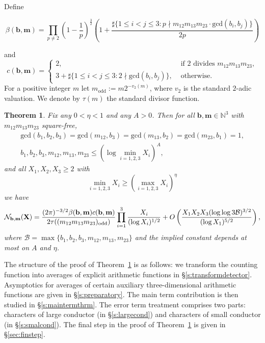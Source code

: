 \documentclass[a4paper,12pt,reqno]{amsart}
\numberwithin{equation}{section} \numberwithin{figure}{section}
\newcommand\N{\mathbb{N}}
\renewcommand{\l}{\left}
\renewcommand{\r}{\right}
\renewcommand{\b}{\mathbf}
\renewcommand{\c}{\mathcal}
\renewcommand{\gcd}{\textrm{gcd}}
\renewcommand{\leq}{\leqslant}
\renewcommand{\geq}{\geqslant}
\renewcommand{\#}{\sharp}
\newtheorem{theorem}[lemma]{Theorem}
\theoremstyle{definition}
\numberwithin{lemma}{section}
\newcommand{\beq}[2]
{
\begin{equation}
\label{#1}
{#2}
\end{equation}
}
\begin{document}
Define 
\beq{defbetabm}
{
\beta(\b b , \b m )= 
 \prod_{  p\neq 2  } 
 \l(1-\frac{1}{p} \r)^{\frac{3}{2} }
\l(1+  \frac{\#\{1\leq i < j  \leq 3 : p\nmid m_{12} m_{13}  m_{23} \cdot \gcd(b_i,b_j)  \}}{2 p} \r) }
and 
\[ c(\b b , \b m )=  
\begin{cases}
2, & \text{ if } 2 \text{ divides  } m_{12}m_{13}m_{23} ,\\
 3+\#\{ 1\leq  i< j \leq 3  : 2\nmid \gcd(b_i,b_j)\}   , & \text{ otherwise}.
 \end{cases}\] 
For a positive integer $m$ let $m_{\textrm{odd}}:=m2^{-v_2(m)}$, where $v_2$ is the standard $2$-adic valuation.
We denote by $\tau(m)$ the standard divisor function.
 \begin{theorem}\label{thm:genguo} Fix any $0<\eta<1$ and any $A>0$. Then for all $\b b, \b m \in \N^3$ with 
$m_{12}m_{13}m_{23}$ square-free, 
\begin{eqnarray}  
\gcd(b_1,b_2,b_3   )=
\gcd(m_{12},b_3   )= \gcd(m_{13},b_2   )= \gcd(m_{23},b_1   )=1, \nonumber  \\
 b_1,b_2,b_3,m_{12},m_{13},m_{23} \leq(\log\min_{i=1,2,3}  X_i)^A,  \label{eq:should}
\end{eqnarray}
and  all $X _1,X_2,X_3\geq 2  $   with 
\begin{equation}\label{eq:should23}\min_{i=1,2,3} X_i \geq 
\l(\max_{i=1,2,3} X_i \r)^\eta\end{equation}   
we have \[  \mathcal{N}_{  \b b, \b m}( \b X) =
 \frac{    (2\pi )^{-3/2}  \beta(\b b , \b m )
c(\b b , \b m )
  }{  2 \tau(( m_{12}    m_{13} m_{23})_{\rm{odd}})   }
  \prod_{i=1}^3  \frac{X_i}{ (\log X_i)^{1/2} }
 + O  \l ( \frac{X_1 X_2 X_3 (\log \log 3 \c B )^{3/2}}{ (\log  X_1)^{5/2} }\r )   ,\]  where 
$\c B=\max\{ b_1,b_2,b_3,m_{12},m_{13},m_{23}\}$ and 
the implied constant depends at most on $A$ and $\eta$.  \end{theorem}

The structure of the proof of Theorem~\ref{thm:genguo} is as follows:
we transform the counting function  into  averages of  explicit arithmetic  functions in \S\ref{s:transformdetector}.
Asymptotics  for  averages of   certain auxiliary three-dimensional
arithmetic functions are given in \S\ref{s:preparatory}.
The main term contribution is then studied in  \S\ref{s:maintermthrm}.
The error term treatment comprises two parts: 
characters of large conductor (in \S\ref{s:largecond})
and characters of small conductor (in \S\ref{s:smalcond}). 
The final step in the proof of Theorem~\ref{thm:genguo} is given in   \S\ref{sec:finstep}. 
\end{document}

